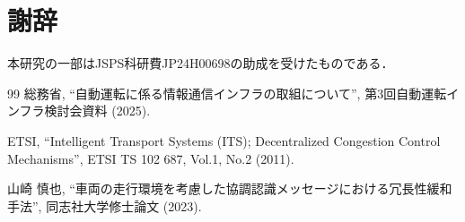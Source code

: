 \documentclass{fitj}
\begin{document}


\section*{謝辞}
本研究の一部はJSPS科研費JP24H00698の助成を受けたものである．


{\footnotesize 
\begin{thebibliography}{99}
  総務省, “自動運転に係る情報通信インフラの取組について”, 第3回自動運転インフラ検討会資料 (2025).

  ETSI, “Intelligent Transport Systems (ITS); Decentralized Congestion Control Mechanisms”, ETSI TS 102 687, Vol.1, No.2 (2011).

  山崎 慎也, “車両の走行環境を考慮した協調認識メッセージにおける冗長性緩和手法”, 同志社大学修士論文 (2023).
\end{thebibliography}
}
\end{document}
